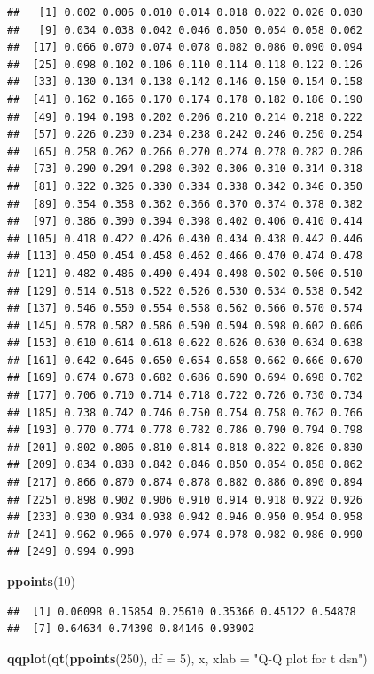 \documentclass[11pt,]{krantz}
\makeatletter
\newenvironment{Shaded}{\begin{snugshade}}{\end{snugshade}}
\newcommand{\KeywordTok}[1]{\textcolor[rgb]{0.13,0.29,0.53}{\textbf{#1}}}
\newcommand{\DataTypeTok}[1]{\textcolor[rgb]{0.13,0.29,0.53}{#1}}
\newcommand{\DecValTok}[1]{\textcolor[rgb]{0.00,0.00,0.81}{#1}}
\newcommand{\StringTok}[1]{\textcolor[rgb]{0.31,0.60,0.02}{#1}}
\newcommand{\NormalTok}[1]{#1}
\newenvironment{kframe}{%
\medskip{}
\setlength{\fboxsep}{.8em}
 \def\at@end@of@kframe{}%
 \ifinner\ifhmode%
  \def\at@end@of@kframe{\end{minipage}}%
  \begin{minipage}{\columnwidth}%
 \fi\fi%
 \def\FrameCommand##1{\hskip\@totalleftmargin \hskip-\fboxsep
 \colorbox{shadecolor}{##1}\hskip-\fboxsep
     \hskip-\linewidth \hskip-\@totalleftmargin \hskip\columnwidth}%
 \MakeFramed {\advance\hsize-\width
   \@totalleftmargin\z@ \linewidth\hsize
   \@setminipage}}%
 {\par\unskip\endMakeFramed%
 \at@end@of@kframe}
\renewenvironment{Shaded}{\begin{kframe}}{\end{kframe}}
\theoremstyle{definition}
\theoremstyle{definition}
\theoremstyle{remark}
\makeatother
\begin{document}
\begin{verbatim}
##   [1] 0.002 0.006 0.010 0.014 0.018 0.022 0.026 0.030
##   [9] 0.034 0.038 0.042 0.046 0.050 0.054 0.058 0.062
##  [17] 0.066 0.070 0.074 0.078 0.082 0.086 0.090 0.094
##  [25] 0.098 0.102 0.106 0.110 0.114 0.118 0.122 0.126
##  [33] 0.130 0.134 0.138 0.142 0.146 0.150 0.154 0.158
##  [41] 0.162 0.166 0.170 0.174 0.178 0.182 0.186 0.190
##  [49] 0.194 0.198 0.202 0.206 0.210 0.214 0.218 0.222
##  [57] 0.226 0.230 0.234 0.238 0.242 0.246 0.250 0.254
##  [65] 0.258 0.262 0.266 0.270 0.274 0.278 0.282 0.286
##  [73] 0.290 0.294 0.298 0.302 0.306 0.310 0.314 0.318
##  [81] 0.322 0.326 0.330 0.334 0.338 0.342 0.346 0.350
##  [89] 0.354 0.358 0.362 0.366 0.370 0.374 0.378 0.382
##  [97] 0.386 0.390 0.394 0.398 0.402 0.406 0.410 0.414
## [105] 0.418 0.422 0.426 0.430 0.434 0.438 0.442 0.446
## [113] 0.450 0.454 0.458 0.462 0.466 0.470 0.474 0.478
## [121] 0.482 0.486 0.490 0.494 0.498 0.502 0.506 0.510
## [129] 0.514 0.518 0.522 0.526 0.530 0.534 0.538 0.542
## [137] 0.546 0.550 0.554 0.558 0.562 0.566 0.570 0.574
## [145] 0.578 0.582 0.586 0.590 0.594 0.598 0.602 0.606
## [153] 0.610 0.614 0.618 0.622 0.626 0.630 0.634 0.638
## [161] 0.642 0.646 0.650 0.654 0.658 0.662 0.666 0.670
## [169] 0.674 0.678 0.682 0.686 0.690 0.694 0.698 0.702
## [177] 0.706 0.710 0.714 0.718 0.722 0.726 0.730 0.734
## [185] 0.738 0.742 0.746 0.750 0.754 0.758 0.762 0.766
## [193] 0.770 0.774 0.778 0.782 0.786 0.790 0.794 0.798
## [201] 0.802 0.806 0.810 0.814 0.818 0.822 0.826 0.830
## [209] 0.834 0.838 0.842 0.846 0.850 0.854 0.858 0.862
## [217] 0.866 0.870 0.874 0.878 0.882 0.886 0.890 0.894
## [225] 0.898 0.902 0.906 0.910 0.914 0.918 0.922 0.926
## [233] 0.930 0.934 0.938 0.942 0.946 0.950 0.954 0.958
## [241] 0.962 0.966 0.970 0.974 0.978 0.982 0.986 0.990
## [249] 0.994 0.998
\end{verbatim}

\begin{Shaded}
\begin{Highlighting}[]
\KeywordTok{ppoints}\NormalTok{(}\DecValTok{10}\NormalTok{)}
\end{Highlighting}
\end{Shaded}

\begin{verbatim}
##  [1] 0.06098 0.15854 0.25610 0.35366 0.45122 0.54878
##  [7] 0.64634 0.74390 0.84146 0.93902
\end{verbatim}

\begin{Shaded}
\begin{Highlighting}[]
\KeywordTok{qqplot}\NormalTok{(}\KeywordTok{qt}\NormalTok{(}\KeywordTok{ppoints}\NormalTok{(}\DecValTok{250}\NormalTok{), }\DataTypeTok{df =} \DecValTok{5}\NormalTok{), x, }\DataTypeTok{xlab =} \StringTok{"Q-Q plot for t dsn"}\NormalTok{)}
\end{Highlighting}
\end{Shaded}
\end{document}
